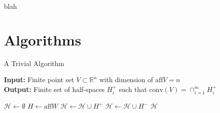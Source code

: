 \documentclass[9pt]{beamer}
\newcommand\R{\mathbb{R}}
\theoremstyle{definition}
\begin{document}

\begin{frame}[fragile]{}
  blah
\end{frame}



\section{Algorithms}

\begin{frame}[fragile]{A Trivial Algorithm}
  
  \begin{algorithm}[H]
    \textbf{Input:} Finite point set $V \subset \R^n$ with dimension of $\text{aff}V = n$\\
    \textbf{Output:} Finite set of half-spaces $H_i^+$ such that $\text{conv}(V) =
    \cap_{i=1}^m H_i^+$
    \begin{algorithmic}[1]
      \STATE $\mathcal{H} \leftarrow \emptyset$
      \STATE $H \leftarrow \text{aff} W$
      \STATE $\mathcal{H} \leftarrow \mathcal{H} \cup H^+$
      \ELSE $\mathcal{H} \leftarrow \mathcal{H} \cup H^-$
      \ENDIF
      \ENDFOR
      \RETURN $\mathcal{H}$
    \end{algorithmic}
  \end{algorithm}
\end{frame}
\end{document}
